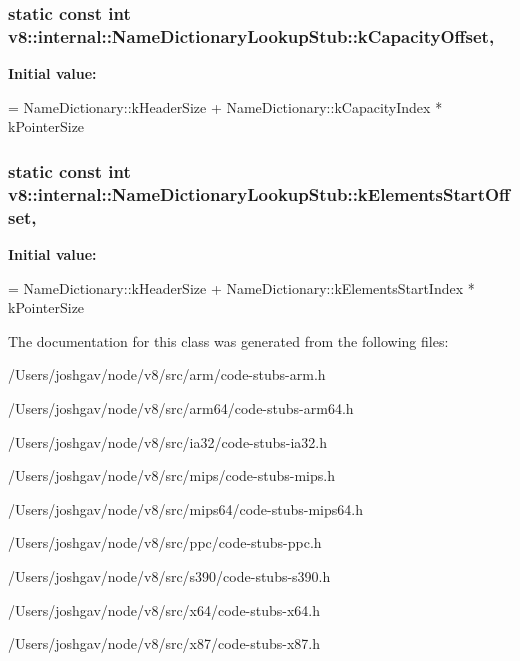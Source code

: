 \subsubsection[{\texorpdfstring{k\+Capacity\+Offset}{kCapacityOffset}}]{\setlength{\rightskip}{0pt plus 5cm}static const int v8\+::internal\+::\+Name\+Dictionary\+Lookup\+Stub\+::k\+Capacity\+Offset\hspace{0.3cm}{\ttfamily [static]}, {\ttfamily [private]}}\hypertarget{classv8_1_1internal_1_1_name_dictionary_lookup_stub_a3aad658408e3e6937ddfaa9b571b4ce6}{}\label{classv8_1_1internal_1_1_name_dictionary_lookup_stub_a3aad658408e3e6937ddfaa9b571b4ce6}
{\bfseries Initial value\+:}
\begin{DoxyCode}
=
      NameDictionary::kHeaderSize +
      NameDictionary::kCapacityIndex * kPointerSize
\end{DoxyCode}
\subsubsection[{\texorpdfstring{k\+Elements\+Start\+Offset}{kElementsStartOffset}}]{\setlength{\rightskip}{0pt plus 5cm}static const int v8\+::internal\+::\+Name\+Dictionary\+Lookup\+Stub\+::k\+Elements\+Start\+Offset\hspace{0.3cm}{\ttfamily [static]}, {\ttfamily [private]}}\hypertarget{classv8_1_1internal_1_1_name_dictionary_lookup_stub_a0703e0e96ff2228a9e088fb7c0865b7e}{}\label{classv8_1_1internal_1_1_name_dictionary_lookup_stub_a0703e0e96ff2228a9e088fb7c0865b7e}
{\bfseries Initial value\+:}
\begin{DoxyCode}
=
      NameDictionary::kHeaderSize +
      NameDictionary::kElementsStartIndex * kPointerSize
\end{DoxyCode}


The documentation for this class was generated from the following files\+:\begin{DoxyCompactItemize}
\item 
/\+Users/joshgav/node/v8/src/arm/code-\/stubs-\/arm.\+h\item 
/\+Users/joshgav/node/v8/src/arm64/code-\/stubs-\/arm64.\+h\item 
/\+Users/joshgav/node/v8/src/ia32/code-\/stubs-\/ia32.\+h\item 
/\+Users/joshgav/node/v8/src/mips/code-\/stubs-\/mips.\+h\item 
/\+Users/joshgav/node/v8/src/mips64/code-\/stubs-\/mips64.\+h\item 
/\+Users/joshgav/node/v8/src/ppc/code-\/stubs-\/ppc.\+h\item 
/\+Users/joshgav/node/v8/src/s390/code-\/stubs-\/s390.\+h\item 
/\+Users/joshgav/node/v8/src/x64/code-\/stubs-\/x64.\+h\item 
/\+Users/joshgav/node/v8/src/x87/code-\/stubs-\/x87.\+h\end{DoxyCompactItemize}
